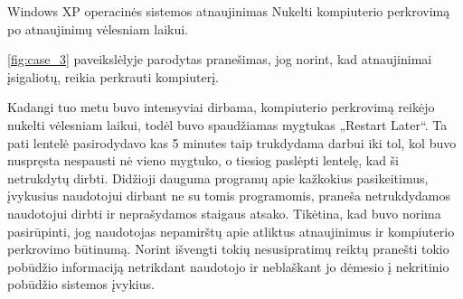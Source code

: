 ﻿\begin{xcase}{Windows XP operacinės sistemos atnaujinimas}
  \xcgoal
  {
    Nukelti kompiuterio perkrovimą po atnaujinimų vėlesniam laikui.
  }
  \xctools
  {
    \ref{fig:case_3} paveikslėlyje parodytas pranešimas, jog norint, kad atnaujinimai įsigaliotų, 
    reikia perkrauti kompiuterį.

  }
  \xcresult
  {
    Kadangi tuo metu buvo intensyviai dirbama, kompiuterio perkrovimą reikėjo nukelti vėlesniam 
    laikui, todėl buvo spaudžiamas mygtukas „Restart Later“. Ta pati lentelė pasirodydavo kas 5 
    minutes taip trukdydama darbui iki tol, kol buvo nuspręsta nespausti nė vieno mygtuko, o 
    tiesiog paslėpti lentelę, kad ši netrukdytų dirbti.
  }
  \xcprinciples
  {
    {
      Didžioji dauguma programų apie kažkokius pasikeitimus, įvykusius naudotojui dirbant ne su 
      tomis programomis, praneša netrukdydamos naudotojui dirbti ir neprašydamos staigaus atsako.
    }
  }
  \xcthoughts
  {
    Tikėtina, kad buvo norima pasirūpinti, jog naudotojas nepamirštų
    apie atliktus atnaujinimus ir kompiuterio perkrovimo būtinumą.
    Norint išvengti tokių nesusipratimų reiktų pranešti tokio
    pobūdžio informaciją netrikdant naudotojo ir neblaškant jo
    dėmesio į nekritinio pobūdžio sistemos įvykius.
  }
\end{xcase}
